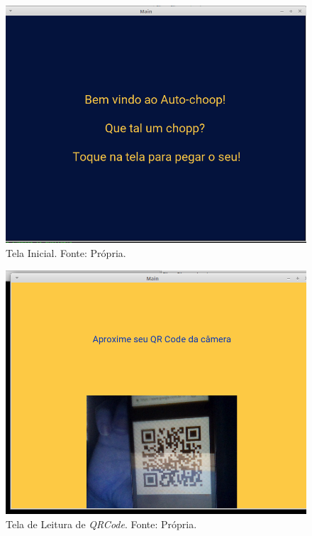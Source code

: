 \begin{figure}[H]
    \centering
    \includegraphics[scale= 0.4]{figuras/home-screen.png}
    \caption{Tela Inicial. Fonte: Própria.}
    \label{home-screen}
\end{figure}

\begin{figure}[H]
    \centering
    \includegraphics[scale= 0.4]{figuras/leitor-qrcode.png}
    \caption{Tela de Leitura de \textit{QRCode}. Fonte: Própria.}
    \label{leitor-qrcode}
\end{figure}

